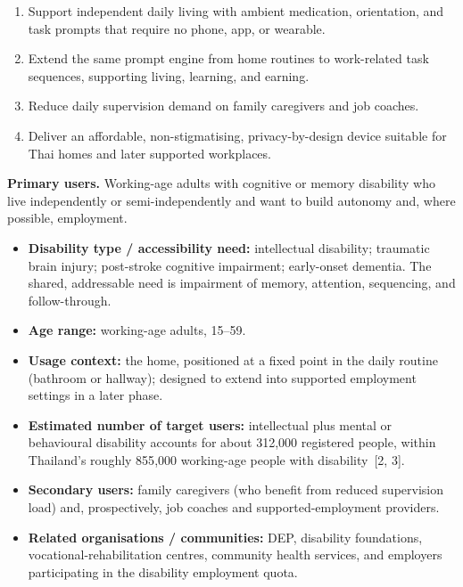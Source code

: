   \item {}

    \begin{enumerate}
      \item Support independent daily living with ambient medication, orientation, and
        task prompts that require no phone, app, or wearable.
      \item Extend the same prompt engine from home routines to work-related task
        sequences, supporting living, learning, and earning.
      \item Reduce daily supervision demand on family caregivers and job coaches.
      \item Deliver an affordable, non-stigmatising, privacy-by-design device suitable
        for Thai homes and later supported workplaces.
    \end{enumerate}

  \item {}

    \textbf{Primary users.} Working-age adults with cognitive or memory disability who
    live independently or semi-independently and want to build autonomy and, where
    possible, employment.
    \begin{itemize}
      \item \textbf{Disability type / accessibility need:} intellectual disability;
        traumatic brain injury; post-stroke cognitive impairment; early-onset
        dementia. The shared, addressable need is impairment of memory, attention,
        sequencing, and follow-through.
      \item \textbf{Age range:} working-age adults, 15--59.
      \item \textbf{Usage context:} the home, positioned at a fixed point in the
        daily routine (bathroom or hallway); designed to extend into supported
        employment settings in a later phase.
      \item \textbf{Estimated number of target users:} intellectual plus mental or
        behavioural disability accounts for about 312{,}000 registered people, within
        Thailand's roughly 855{,}000 working-age people with disability~[2, 3].
      \item \textbf{Secondary users:} family caregivers (who benefit from reduced
        supervision load) and, prospectively, job coaches and supported-employment
        providers.
      \item \textbf{Related organisations / communities:} DEP, disability foundations,
        vocational-rehabilitation centres, community health services, and employers
        participating in the disability employment quota.
    \end{itemize}
